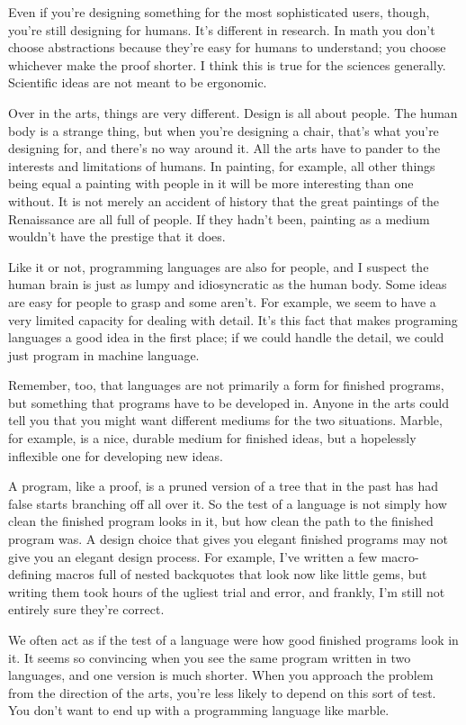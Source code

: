 Even if you're designing something for the most sophisticated users,
though, you're still designing for humans. It's different in research.
In math you don't choose abstractions because they're easy for humans to
understand; you choose whichever make the proof shorter. I think this is
true for the sciences generally. Scientific ideas are not meant to be
ergonomic.

Over in the arts, things are very different. Design is all about people.
The human body is a strange thing, but when you're designing a chair,
that's what you're designing for, and there's no way around it. All the
arts have to pander to the interests and limitations of humans. In
painting, for example, all other things being equal a painting with
people in it will be more interesting than one without. It is not merely
an accident of history that the great paintings of the Renaissance are
all full of people. If they hadn't been, painting as a medium wouldn't
have the prestige that it does.

Like it or not, programming languages are also for people, and I suspect
the human brain is just as lumpy and idiosyncratic as the human body.
Some ideas are easy for people to grasp and some aren't. For example, we
seem to have a very limited capacity for dealing with detail. It's this
fact that makes programing languages a good idea in the first place; if
we could handle the detail, we could just program in machine language.

Remember, too, that languages are not primarily a form for finished
programs, but something that programs have to be developed in. Anyone in
the arts could tell you that you might want different mediums for the
two situations. Marble, for example, is a nice, durable medium for
finished ideas, but a hopelessly inflexible one for developing new
ideas.

A program, like a proof, is a pruned version of a tree that in the past
has had false starts branching off all over it. So the test of a
language is not simply how clean the finished program looks in it, but
how clean the path to the finished program was. A design choice that
gives you elegant finished programs may not give you an elegant design
process. For example, I've written a few macro-defining macros full of
nested backquotes that look now like little gems, but writing them took
hours of the ugliest trial and error, and frankly, I'm still not
entirely sure they're correct.

We often act as if the test of a language were how good finished
programs look in it. It seems so convincing when you see the same
program written in two languages, and one version is much shorter. When
you approach the problem from the direction of the arts, you're less
likely to depend on this sort of test. You don't want to end up with a
programming language like marble.

